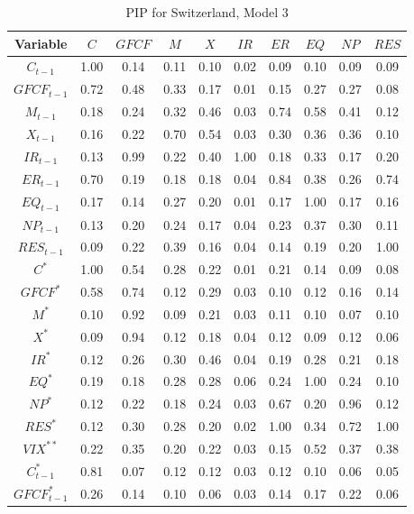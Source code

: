 \documentclass[a4paper, twoside]{templates/ociamthesis}
\begin{document}
\begin{table}[!ht]

\caption{\label{tab:TablePIPCH3}PIP for Switzerland, Model 3}
\centering
\fontsize{7}{9}\selectfont
\begin{tabular}[t]{cccccccccc}
\toprule
Variable & $C$ & $GFCF$ & $M$ & $X$ & $IR$ & $ER$ & $EQ$ & $NP$ & $RES$\\
\midrule
$C_{t-1}$ & 1.00 & 0.14 & 0.11 & 0.10 & 0.02 & 0.09 & 0.10 & 0.09 & 0.09\\
$GFCF_{t-1}$ & 0.72 & 0.48 & 0.33 & 0.17 & 0.01 & 0.15 & 0.27 & 0.27 & 0.08\\
$M_{t-1}$ & 0.18 & 0.24 & 0.32 & 0.46 & 0.03 & 0.74 & 0.58 & 0.41 & 0.12\\
$X_{t-1}$ & 0.16 & 0.22 & 0.70 & 0.54 & 0.03 & 0.30 & 0.36 & 0.36 & 0.10\\
$IR_{t-1}$ & 0.13 & 0.99 & 0.22 & 0.40 & 1.00 & 0.18 & 0.33 & 0.17 & 0.20\\
$ER_{t-1}$ & 0.70 & 0.19 & 0.18 & 0.18 & 0.04 & 0.84 & 0.38 & 0.26 & 0.74\\
$EQ_{t-1}$ & 0.17 & 0.14 & 0.27 & 0.20 & 0.01 & 0.17 & 1.00 & 0.17 & 0.16\\
$NP_{t-1}$ & 0.13 & 0.20 & 0.24 & 0.17 & 0.04 & 0.23 & 0.37 & 0.30 & 0.11\\
$RES_{t-1}$ & 0.09 & 0.22 & 0.39 & 0.16 & 0.04 & 0.14 & 0.19 & 0.20 & 1.00\\
$C^*$ & 1.00 & 0.54 & 0.28 & 0.22 & 0.01 & 0.21 & 0.14 & 0.09 & 0.08\\
$GFCF^*$ & 0.58 & 0.74 & 0.12 & 0.29 & 0.03 & 0.10 & 0.12 & 0.16 & 0.14\\
$M^*$ & 0.10 & 0.92 & 0.09 & 0.21 & 0.03 & 0.11 & 0.10 & 0.07 & 0.10\\
$X^*$ & 0.09 & 0.94 & 0.12 & 0.18 & 0.04 & 0.12 & 0.09 & 0.12 & 0.06\\
$IR^*$ & 0.12 & 0.26 & 0.30 & 0.46 & 0.04 & 0.19 & 0.28 & 0.21 & 0.18\\
$EQ^*$ & 0.19 & 0.18 & 0.28 & 0.28 & 0.06 & 0.24 & 1.00 & 0.24 & 0.10\\
$NP^*$ & 0.12 & 0.22 & 0.18 & 0.24 & 0.03 & 0.67 & 0.20 & 0.96 & 0.12\\
$RES^*$ & 0.12 & 0.30 & 0.28 & 0.20 & 0.02 & 1.00 & 0.34 & 0.72 & 1.00\\
$VIX^{**}$ & 0.22 & 0.35 & 0.20 & 0.22 & 0.03 & 0.15 & 0.52 & 0.37 & 0.38\\
$C^*_{t-1}$ & 0.81 & 0.07 & 0.12 & 0.12 & 0.03 & 0.12 & 0.10 & 0.06 & 0.05\\
$GFCF^*_{t-1}$ & 0.26 & 0.14 & 0.10 & 0.06 & 0.03 & 0.14 & 0.17 & 0.22 & 0.06\\

\end{tabular}
\end{table}
\end{document}
